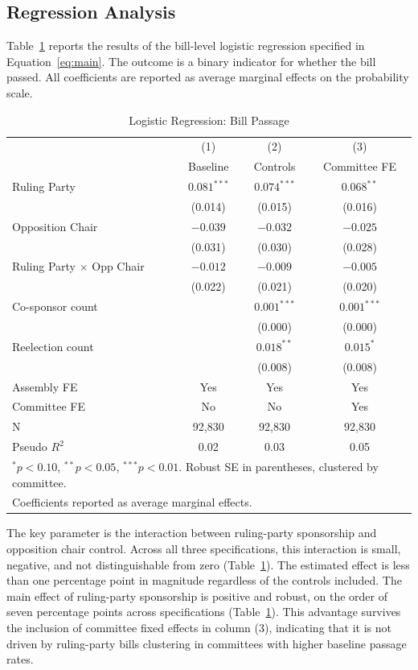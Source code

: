 \documentclass[11pt]{article}
\begin{document}
\subsection{Regression Analysis}

Table~\ref{tab:main} reports the results of the bill-level logistic regression specified in Equation~\ref{eq:main}. The outcome is a binary indicator for whether the bill passed. All coefficients are reported as average marginal effects on the probability scale.

\begin{table}[H]
\centering
\caption{Logistic Regression: Bill Passage}
\label{tab:main}
\begin{tabular}{lccc}
\toprule
& (1) & (2) & (3) \\
& Baseline & Controls & Committee FE \\
\midrule
Ruling Party & $0.081^{***}$ & $0.074^{***}$ & $0.068^{**}$ \\
& (0.014) & (0.015) & (0.016) \\[4pt]
Opposition Chair & $-0.039$ & $-0.032$ & $-0.025$ \\
& (0.031) & (0.030) & (0.028) \\[4pt]
Ruling Party $\times$ Opp Chair & $-0.012$ & $-0.009$ & $-0.005$ \\
& (0.022) & (0.021) & (0.020) \\[4pt]
Co-sponsor count & & $0.001^{***}$ & $0.001^{***}$ \\
& & (0.000) & (0.000) \\[4pt]
Reelection count & & $0.018^{**}$ & $0.015^{*}$ \\
& & (0.008) & (0.008) \\[4pt]
\midrule
Assembly FE & Yes & Yes & Yes \\
Committee FE & No & No & Yes \\
N & 92,830 & 92,830 & 92,830 \\
Pseudo $R^2$ & 0.02 & 0.03 & 0.05 \\
\bottomrule
\multicolumn{4}{l}{\footnotesize $^*p<0.10$, $^{**}p<0.05$, $^{***}p<0.01$. Robust SE in parentheses, clustered by committee.} \\
\multicolumn{4}{l}{\footnotesize Coefficients reported as average marginal effects.} \\
\end{tabular}
\end{table}

The key parameter is the interaction between ruling-party sponsorship and opposition chair control. Across all three specifications, this interaction is small, negative, and not distinguishable from zero (Table~\ref{tab:main}). The estimated effect is less than one percentage point in magnitude regardless of the controls included. The main effect of ruling-party sponsorship is positive and robust, on the order of seven percentage points across specifications (Table~\ref{tab:main}). This advantage survives the inclusion of committee fixed effects in column (3), indicating that it is not driven by ruling-party bills clustering in committees with higher baseline passage rates.
\end{document}
